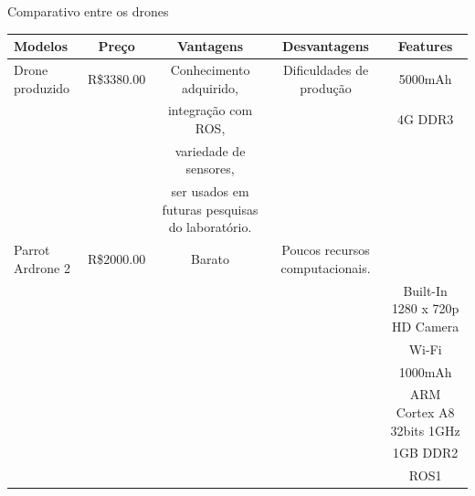 \begin{frame}[t]{Comparativo entre os drones}
    \transboxout[duration=0.5]
    \centering

    \begin{tabular}{ l|c|c|c|c}
      \textbf{Modelos}                & \textbf{Preço} & \textbf{Vantagens} & \textbf{Desvantagens} & \textbf{Features}\\ 
      \hline
        Drone produzido     &  R\$3380.00  & Conhecimento adquirido,                         & Dificuldades de produção         & 5000mAh                        \\ 
                            &              & integração com ROS,                             &                                  & 4G DDR3                        \\
                            &              & variedade de sensores,                          &                                  &                                \\
                            &              & ser usados em futuras pesquisas do laboratório. &                                  &                                \\
        \hline
      Parrot Ardrone 2      &  R\$2000.00  & Barato                                          & Poucos recursos computacionais.  &                                \\
                            &              &                                                 &                                  & Built-In 1280 x 720p HD Camera \\
                            &              &                                                 &                                  & Wi-Fi                          \\
                            &              &                                                 &                                  & 1000mAh                        \\
                            &              &                                                 &                                  & ARM Cortex A8 32bits 1GHz      \\
                            &              &                                                 &                                  & 1GB DDR2                       \\
                            &              &                                                 &                                  & ROS1                           \\
      \hline
    \end{tabular}

\end{frame}